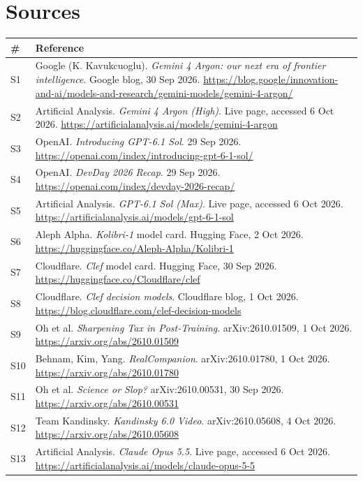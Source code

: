 \documentclass[11pt,a4paper]{article}
\begin{document}
\clearpage
\section{Sources}
{\footnotesize
\begin{tabularx}{\textwidth}{@{}l X@{}}
\toprule
\textbf{\#} & \textbf{Reference} \\
\midrule
S1  & Google (K. Kavukcuoglu). \emph{Gemini 4 Argon: our next era of frontier intelligence}. Google blog, 30 Sep 2026. \url{https://blog.google/innovation-and-ai/models-and-research/gemini-models/gemini-4-argon/} \\
S2  & Artificial Analysis. \emph{Gemini 4 Argon (High)}. Live page, accessed 6 Oct 2026. \url{https://artificialanalysis.ai/models/gemini-4-argon} \\
S3  & OpenAI. \emph{Introducing GPT-6.1 Sol}. 29 Sep 2026. \url{https://openai.com/index/introducing-gpt-6-1-sol/} \\
S4  & OpenAI. \emph{DevDay 2026 Recap}. 29 Sep 2026. \url{https://openai.com/index/devday-2026-recap/} \\
S5  & Artificial Analysis. \emph{GPT-6.1 Sol (Max)}. Live page, accessed 6 Oct 2026. \url{https://artificialanalysis.ai/models/gpt-6-1-sol} \\
S6  & Aleph Alpha. \emph{Kolibri-1} model card. Hugging Face, 2 Oct 2026. \url{https://huggingface.co/Aleph-Alpha/Kolibri-1} \\
S7  & Cloudflare. \emph{Clef} model card. Hugging Face, 30 Sep 2026. \url{https://huggingface.co/Cloudflare/clef} \\
S8  & Cloudflare. \emph{Clef decision models}. Cloudflare blog, 1 Oct 2026. \url{https://blog.cloudflare.com/clef-decision-models} \\
S9  & Oh et al. \emph{Sharpening Tax in Post-Training}. arXiv:2610.01509, 1 Oct 2026. \url{https://arxiv.org/abs/2610.01509} \\
S10 & Behnam, Kim, Yang. \emph{RealCompanion}. arXiv:2610.01780, 1 Oct 2026. \url{https://arxiv.org/abs/2610.01780} \\
S11 & Oh et al. \emph{Science or Slop?} arXiv:2610.00531, 30 Sep 2026. \url{https://arxiv.org/abs/2610.00531} \\
S12 & Team Kandinsky. \emph{Kandinsky 6.0 Video}. arXiv:2610.05608, 4 Oct 2026. \url{https://arxiv.org/abs/2610.05608} \\
S13 & Artificial Analysis. \emph{Claude Opus 5.5}. Live page, accessed 6 Oct 2026. \url{https://artificialanalysis.ai/models/claude-opus-5-5} \\

\end{tabularx}}
\end{document}
